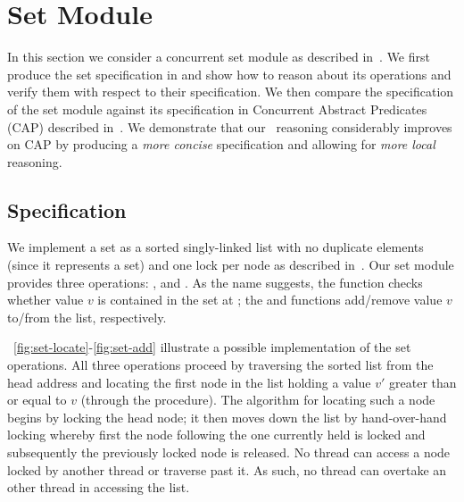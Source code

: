 %
%
\vspace{-2ex}
\clearpage\section{Set Module}\label{sec:set-example}
In this section we consider a concurrent set module as described in~\cite{cap-ecoop10}. We first produce the set specification in \colosl and show how to reason about its operations and verify them with respect to their specification. We then compare the \colosl specification of the set module against its specification in Concurrent Abstract Predicates (CAP) described in~\cite{cap-ecoop10}. We demonstrate that our \colosl\ reasoning considerably improves on CAP by producing a \emph{more concise} specification and allowing for \emph{more local} reasoning. 

\subsection*{\colosl Specification}
We implement a set as a sorted singly-linked list with no duplicate elements (since it represents a set) and one lock per node as described in~\cite{cap-ecoop10}. Our set module provides three operations: ,  and .
As the name suggests, the  function checks whether value $v$ is contained in the set at ; the  and  functions add/remove value $v$ to/from the list, respectively.

\fig~\ref{fig:set-locate}-\ref{fig:set-add} illustrate a possible implementation of the set operations. All three operations proceed by traversing the sorted list from the head address and locating the first node in the list holding a value $v'$ greater than or equal to $v$ (through the  procedure). The algorithm for locating such a node begins by locking the head node; it then moves down the list by hand-over-hand locking whereby first the node following the one currently held is locked and subsequently the previously locked node is released. No thread can access a node locked by another thread or traverse past it. As such, no thread can overtake an other thread in accessing the list. 
%


%


